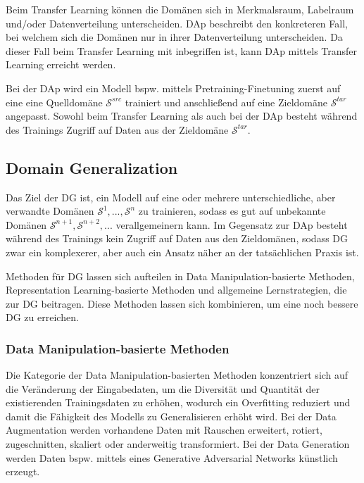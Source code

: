 Beim Transfer Learning können die Domänen sich in Merkmalsraum, Labelraum und/oder Datenverteilung unterscheiden. \gls{DAp} beschreibt den konkreteren Fall, bei welchem sich die Domänen nur in ihrer Datenverteilung unterscheiden. Da dieser Fall beim Transfer Learning mit inbegriffen ist, kann \gls{DAp} mittels Transfer Learning erreicht werden. \cite{kouw_introduction_2019}

Bei der \gls{DAp} wird ein Modell bspw. mittels Pretraining-Finetuning zuerst auf eine eine Quelldomäne $\mathcal{S}^{src}$ trainiert und anschließend auf eine Zieldomäne $\mathcal{S}^{tar}$ angepasst. Sowohl beim Transfer Learning als auch bei der \gls{DAp} besteht während des Trainings Zugriff auf Daten aus der Zieldomäne $\mathcal{S}^{tar}$. \cite{wang_generalizing_2023} 

\subsection{Domain Generalization}
 
Das Ziel der \gls{DG} ist, ein Modell auf eine oder mehrere unterschiedliche, aber verwandte Domänen $\mathcal{S}^1,...,\mathcal{S}^n$ zu trainieren, sodass es gut auf unbekannte Domänen $\mathcal{S}^{n+1}, \mathcal{S}^{n+2},...$ verallgemeinern kann. Im Gegensatz zur \gls{DAp} besteht während des Trainings kein Zugriff auf Daten aus den Zieldomänen, sodass \gls{DG} zwar ein komplexerer, aber auch ein Ansatz näher an der tatsächlichen Praxis ist. \cite{wang_generalizing_2023}

Methoden für \gls{DG} lassen sich aufteilen in Data Manipulation-basierte Methoden, Representation Learning-basierte Methoden und allgemeine Lernstrategien, die zur \gls{DG} beitragen. Diese Methoden lassen sich kombinieren, um eine noch bessere \gls{DG} zu erreichen. \cite{wang_generalizing_2023}

\subsubsection*{Data Manipulation-basierte Methoden}

Die Kategorie der Data Manipulation-basierten Methoden konzentriert sich auf die Veränderung der Eingabedaten, um die Diversität und Quantität der existierenden Trainingsdaten zu erhöhen, wodurch ein Overfitting reduziert und damit die Fähigkeit des Modells zu Generalisieren erhöht wird. Bei der Data Augmentation werden vorhandene Daten mit Rauschen erweitert, rotiert, zugeschnitten, skaliert oder anderweitig transformiert. Bei der Data Generation werden Daten bspw. mittels eines Generative Adversarial Networks künstlich erzeugt. \cite{wang_generalizing_2023} 

